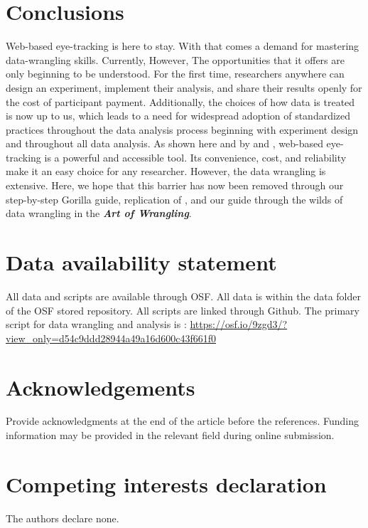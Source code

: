 \section{Conclusions}
Web-based eye-tracking is here to stay. With that comes a demand for mastering data-wrangling skills. Currently, However, The opportunities that it offers are only beginning to be understood. For the first time, researchers anywhere can design an experiment, implement their analysis, and share their results openly for the cost of participant payment. Additionally, the choices of how data is treated is now up to us, which leads to a need for widespread adoption of standardized practices throughout the data analysis process beginning with experiment design and throughout all data analysis. As shown here and by \textcite{Prystauka_Altmann_Rothman_2023} and \textcite{Vos_2017}, web-based eye-tracking is a powerful and accessible tool. Its convenience, cost, and reliability make it an easy choice for any researcher. However, the data wrangling is extensive. Here, we hope that this barrier has now been removed through our step-by-step Gorilla guide, replication of \textcite{Porretta_et_al_2020}, and our guide through the wilds of data wrangling in the \textit{\textbf{Art of Wrangling}}.
 
\section{Data availability statement}
All data and scripts are available through OSF. All data is within the data folder of the OSF stored repository. All scripts are linked through Github. The primary script for data wrangling and analysis is : \url{https://osf.io/9zgd3/?view_only=d54c9ddd28944a49a16d600c43f661f0}

\section{Acknowledgements}
Provide acknowledgments at the end of the article before the references. Funding information may be provided in the relevant field during online submission. 

\section{Competing interests declaration}
The authors declare none.
